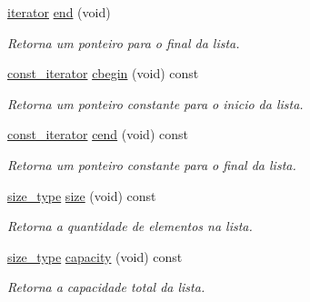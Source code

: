 \begin{DoxyCompactItemize}
\mbox{\label{classsc_1_1vector_a15b7f4313d7a011694d154c030768ad3}} 
\hyperlink{classsc_1_1vector_a9e5d5cc35e379aa27a93989f4a71413c}{iterator} \hyperlink{classsc_1_1vector_a15b7f4313d7a011694d154c030768ad3}{end} (void)
\begin{DoxyCompactList}\small\item\em Retorna um ponteiro para o final da lista. \end{DoxyCompactList}\item 
\mbox{\label{classsc_1_1vector_abf97464250caf4653a104fff421943c8}} 
\hyperlink{classsc_1_1vector_a1e50aa429ea9de6ead4bfdb8614c1c9a}{const\+\_\+iterator} \hyperlink{classsc_1_1vector_abf97464250caf4653a104fff421943c8}{cbegin} (void) const
\begin{DoxyCompactList}\small\item\em Retorna um ponteiro constante para o inicio da lista. \end{DoxyCompactList}\item 
\mbox{\label{classsc_1_1vector_aa6a2e50e9f3eec904cf6ec0f357c8180}} 
\hyperlink{classsc_1_1vector_a1e50aa429ea9de6ead4bfdb8614c1c9a}{const\+\_\+iterator} \hyperlink{classsc_1_1vector_aa6a2e50e9f3eec904cf6ec0f357c8180}{cend} (void) const
\begin{DoxyCompactList}\small\item\em Retorna um ponteiro constante para o final da lista. \end{DoxyCompactList}\item 
\mbox{\label{classsc_1_1vector_afee521145d4c91a523a4ab3c605296a2}} 
\hyperlink{classsc_1_1vector_a48bf37ba1a6d0c13504414d86e27c399}{size\+\_\+type} \hyperlink{classsc_1_1vector_afee521145d4c91a523a4ab3c605296a2}{size} (void) const
\begin{DoxyCompactList}\small\item\em Retorna a quantidade de elementos na lista. \end{DoxyCompactList}\item 
\mbox{\label{classsc_1_1vector_acf5f0cebfb797dac6eb42523d1e7511a}} 
\hyperlink{classsc_1_1vector_a48bf37ba1a6d0c13504414d86e27c399}{size\+\_\+type} \hyperlink{classsc_1_1vector_acf5f0cebfb797dac6eb42523d1e7511a}{capacity} (void) const
\begin{DoxyCompactList}\small\item\em Retorna a capacidade total da lista. \end{DoxyCompactList}\item 

\end{DoxyCompactItemize}
